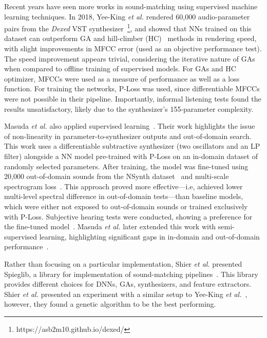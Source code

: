 Recent years have seen more works in sound-matching using supervised machine learning techniques. In 2018, Yee-King \textit{et al.} rendered 60,000 audio-parameter pairs from the \textit{Dexed} \gls{VST} synthesizer~\footnote{https://asb2m10.github.io/dexed/}, and showed that NNs trained on this dataset can outperform GA and hill-climber (\gls{HC})~\cite{hoffmann2000heuristic} methods in rendering speed, with slight improvements in MFCC error (used as an objective performance test). The speed improvement appears trivial, considering the iterative nature of GAs when compared to offline training of supervised models. For GAs and HC optimizer, MFCCs were used as a measure of performance as well as a loss function. For training the networks, P-Loss was used, since differentiable MFCCs were not possible in their pipeline. Importantly, informal listening tests found the results unsatisfactory, likely due to the synthesizer’s 155-parameter complexity. 

Masuda \textit{et al.} also applied supervised learning~\cite{masuda2021soundmatch}. Their work highlights the issue of non-linearity in parameter-to-synthesizer outputs and out-of-domain search. This work uses a differentiable subtractive synthesizer (two oscillators and an LP filter) alongside a NN model pre-trained with P-Loss on an in-domain dataset of randomly selected parameters. After training, the model was fine-tuned using 20,000 out-of-domain sounds from the NSynth dataset~\cite{engel2017neural} and multi-scale spectrogram loss~\cite{engel2020ddsp}. This approach proved more effective---i.e, achieved lower multi-level spectral difference in out-of-domain tests---than baseline models, which were either not exposed to out-of-domain sounds or trained exclusively with P-Loss. Subjective hearing tests were conducted, showing a preference for the fine-tuned model~\cite{masuda2021soundmatch}. Masuda \textit{et al.} later extended this work with semi-supervised learning, highlighting significant gaps in in-domain and out-of-domain performance~\cite{masuda2023improving}.

Rather than focusing on a particular implementation, Shier \textit{et al.} presented Spieglib, a library for implementation of sound-matching pipelines~\cite{shier2020spiegelib}. This library provides different choices for DNNs, GAs, synthesizers, and feature extractors. Shier \textit{et al.} presented an experiment with a similar setup to Yee-King \textit{et al.}~\cite{yee2018automatic}, however, they found a genetic algorithm to be the best performing.

